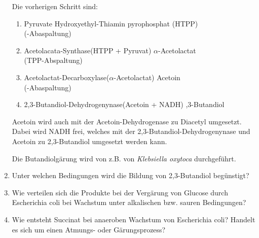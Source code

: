 \begin{enumerate}
		Die vorherigen Schritt sind:
		\begin{enumerate}[label=\arabic*)]
			\item Pyruvate \textrightarrow Hydroxyethyl-Thiamin pyrophosphat (HTPP)	\\
			\hfill(-Abaspaltung)
			\item Acetolacata-Synthase(HTPP + Pyruvat) \textrightarrow \begin{math}\alpha\end{math}-Acetolactat \\
			\hfill(TPP-Abspaltung)
			\item Acetolactat-Decarboxylase(\begin{math}\alpha\end{math}-Acetolactat) \textrightarrow Acetoin \\
			\hfill(-Abaspaltung)
			\item 2,3-Butandiol-Dehydrogenynase(Acetoin + NADH) ,3-Butandiol
		\end{enumerate}
		Acetoin wird auch mit der Acetoin-Dehydrogenase zu Diacetyl umgesetzt.
		Dabei wird NADH frei, 
		welches mit der 2,3-Butandiol-Dehydrogenynase und Acetoin zu 2,3-Butandiol umgesetzt werden kann.

		Die Butandiolgärung wird von z.B. von \emph{Klebsiella oxytoca} durchgeführt.

	\item Unter welchen Bedingungen wird die Bildung von 2,3-Butandiol begünstigt?
	\item Wie verteilen sich die Produkte bei der Vergärung von Glucose durch Escherichia coli bei Wachstum unter alkalischen bzw. sauren Bedingungen?
	\item Wie entsteht Succinat bei anaeroben Wachstum von Escherichia coli? Handelt es sich um einen Atmungs- oder Gärungsprozess?
\end{enumerate}
